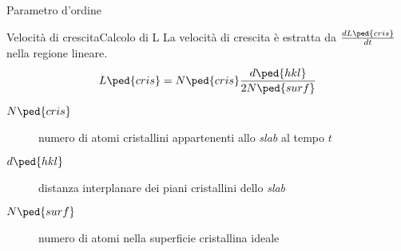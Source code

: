 \documentclass{beamer}
\begin{document}
\begin{frame}{Parametro d'ordine}

\end{frame}

\begin{frame}{Velocità di crescita}{Calcolo di L}
 La velocità di crescita è estratta da $\frac{dL\ped{cris}}{dt}$ nella regione lineare.
 \begin{equation*}
 	L\ped{cris}= N\ped{cris} \frac{d\ped{hkl}}{2 N\ped{surf}}	
 \end{equation*}
 \begin{description}
 	\item [$N\ped{cris}$] numero di atomi cristallini appartenenti allo \emph{slab} al tempo $t$
 	\item [$d\ped{hkl}$] distanza interplanare dei piani cristallini dello \emph{slab}
 	\item [$N\ped{surf}$] numero di atomi nella superficie cristallina ideale
 \end{description}	
\end{frame}
\end{document}
